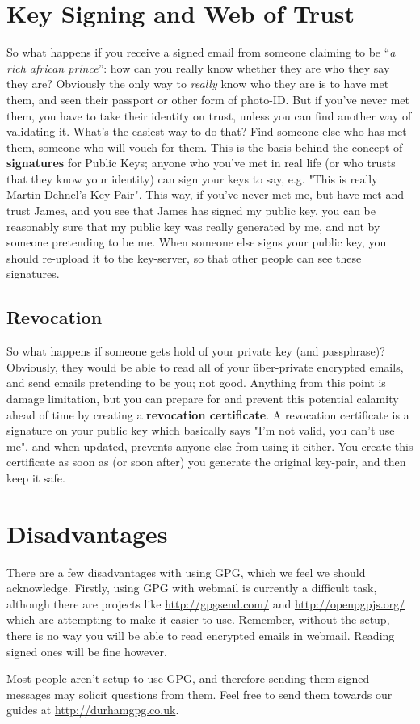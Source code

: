 \section{Key Signing and Web of Trust}

So what happens if you receive a signed email from someone claiming to be ``\textit{a rich african prince}'': how can you really know whether they are who they say they are? Obviously the only way to \textit{really} know who they are is to have met them, and seen their passport or other form of photo-ID. But if you've never met them, you have to take their identity on trust, unless you can find another way of validating it. What's the easiest way to do that? Find someone else who has met them, someone who will vouch for them. This is the basis behind the concept of \textbf{signatures} for Public Keys; anyone who you've met in real life (or who trusts that they know your identity) can sign your keys to say, e.g. "This is really Martin Dehnel's Key Pair". This way, if you've never met me, but have met and trust James, and you see that James has signed my public key, you can be reasonably sure that my public key was really generated by me, and not by someone pretending to be me. When someone else signs your public key, you should re-upload it to the key-server, so that other people can see these signatures.

\subsection{Revocation}
So what happens if someone gets hold of your private key (and passphrase)? Obviously, they would be able to read all of your \"{u}ber-private encrypted emails, and send emails pretending to be you; not good. Anything from this point is damage limitation, but you can prepare for and prevent this potential calamity ahead of time by creating a \textbf{revocation certificate}. A revocation certificate is a signature on your public key which basically says "I'm not valid, you can't use me", and when updated, prevents anyone else from using it either. You create this certificate as soon as (or soon after) you generate the original key-pair, and then keep it safe.


\section{Disadvantages}

There are a few disadvantages with using GPG, which we feel we should acknowledge. Firstly, using GPG with webmail is currently a difficult task, although there are projects like \href{http://gpgsend.com/}{http://gpgsend.com/} and \href{http://openpgpjs.org/}{http://openpgpjs.org/} which are attempting to make it easier to use. Remember, without the setup, there is no way you will be able to read encrypted emails in webmail. Reading signed ones will be fine however.

Most people aren't setup to use GPG, and therefore sending them signed messages may solicit questions from them. Feel free to send them towards our guides at \href{http://durhamgpg.co.uk}{http://durhamgpg.co.uk}.


